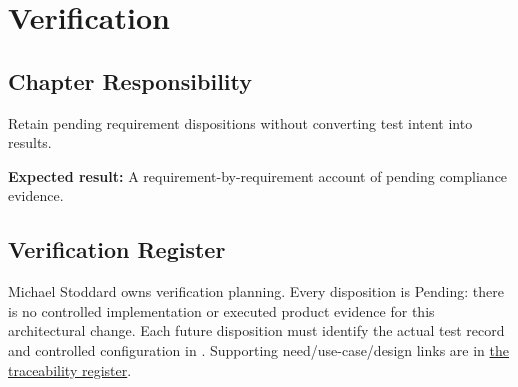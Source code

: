 \chapter{Verification}
\section{Chapter Responsibility}
\label{Section:VerificationResponsibility}
Retain pending requirement dispositions without converting test intent into results.

\noindent\textbf{Expected result:} A requirement-by-requirement account of pending compliance evidence.

\section{Verification Register}
Michael Stoddard owns verification planning. Every disposition is Pending: there is no controlled implementation or executed product evidence for this architectural change. Each future disposition must identify the actual test record and controlled configuration in . Supporting need/use-case/design links are in \hyperref[Table:TraceabilityMatrix]{the traceability register}.

